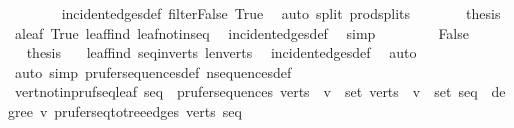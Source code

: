 \begin{isabellebody}
\ \ \ \ \ \ \isamarkupfalse%
\ incident{\isacharunderscore}{\kern0pt}edges{\isacharunderscore}{\kern0pt}def\ filter{\isacharunderscore}{\kern0pt}False\ True\ \isamarkupfalse%
\ {\isacharparenleft}{\kern0pt}auto\ split{\isacharcolon}{\kern0pt}\ prod{\isachardot}{\kern0pt}splits{\isacharparenright}{\kern0pt}\isanewline
\ \ \ \ \isamarkupfalse%
\ \isamarkupfalse%
\ {\isacharquery}{\kern0pt}thesis\ \isamarkupfalse%
\ {\isacartoucheopen}a{\isasymnoteq}leaf{\isacartoucheclose}\ True\ leaf{\isacharunderscore}{\kern0pt}find\ leaf{\isacharunderscore}{\kern0pt}not{\isacharunderscore}{\kern0pt}in{\isacharunderscore}{\kern0pt}seq\ \isamarkupfalse%
\ incident{\isacharunderscore}{\kern0pt}edges{\isacharunderscore}{\kern0pt}def\ \isamarkupfalse%
\ simp\isanewline
\ \ \isamarkupfalse%
\isanewline
\ \ \ \ \isamarkupfalse%
\ False\isanewline
\ \ \ \ \isamarkupfalse%
\ \isamarkupfalse%
\ {\isacharquery}{\kern0pt}thesis\ \isamarkupfalse%
\ {}\ leaf{\isacharunderscore}{\kern0pt}find\ seq{\isacharunderscore}{\kern0pt}in{\isacharunderscore}{\kern0pt}verts{\isacharprime}{\kern0pt}\ len{\isacharunderscore}{\kern0pt}verts{\isacharprime}{\kern0pt}\ \isamarkupfalse%
\ incident{\isacharunderscore}{\kern0pt}edges{\isacharunderscore}{\kern0pt}def\ \isamarkupfalse%
\ auto\isanewline
\ \ \isamarkupfalse%
\isanewline
{}\isamarkupfalse%
\ {\isacharparenleft}{\kern0pt}auto\ simp{\isacharcolon}{\kern0pt}\ prufer{\isacharunderscore}{\kern0pt}sequences{\isacharunderscore}{\kern0pt}def\ n{\isacharunderscore}{\kern0pt}sequences{\isacharunderscore}{\kern0pt}def{\isacharparenright}{\kern0pt}%
\endisatagproof
{\isafoldproof}%
%
\isadelimproof
\isanewline
%
\endisadelimproof
\isanewline
{}\isamarkupfalse%
\ vert{\isacharunderscore}{\kern0pt}notin{\isacharunderscore}{\kern0pt}pruf{\isacharunderscore}{\kern0pt}seq{\isacharunderscore}{\kern0pt}leaf{\isacharcolon}{\kern0pt}\ {\isachardoublequoteopen}seq\ {\isasymin}\ prufer{\isacharunderscore}{\kern0pt}sequences\ verts\ {\isasymLongrightarrow}\ v\ {\isasymin}\ set\ verts\ {\isasymLongrightarrow}\ v\ {\isasymnotin}\ set\ seq\ {\isasymlongleftrightarrow}\ degree\ v\ {\isacharparenleft}{\kern0pt}prufer{\isacharunderscore}{\kern0pt}seq{\isacharunderscore}{\kern0pt}to{\isacharunderscore}{\kern0pt}tree{\isacharunderscore}{\kern0pt}edges\ verts\ seq{\isacharparenright}{\kern0pt}\ {\isacharequal}{\kern0pt}\ {}{\isachardoublequoteclose}\isanewline

\end{isabellebody}
